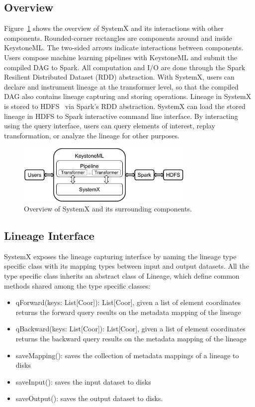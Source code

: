 \documentclass{sig-alternate}
\newenvironment{shortlist}{
        \vspace*{-0.5em}
  \begin{itemize}
  \setlength{\itemsep}{-0.1em}
}{
  \end{itemize}
        \vspace*{-0.5em}
}
\begin{document}
\subsection{Overview}
Figure~\ref{fig:architecture} shows the overview of SystemX and its interactions with other components. 
Rounded-corner rectangles are components around and inside KeystoneML. 
The two-sided arrows indicate interactions between components.
Users compose machine learning pipelines with KeystoneML and submit the compiled DAG to Spark.
All computation and I/O are done through the Spark Resilient Distributed Dataset (RDD) abstraction.
With SystemX, users can declare and instrument lineage at the transformer level, 
so that the compiled DAG also contains lineage capturing and storing operations.
Lineage in SystemX is stored to HDFS~\cite{shvachko10} via Spark's RDD abstraction.
SystemX can load the stored lineage in HDFS to Spark interactive command line interface.
By interacting using the query interface, users can query elements of interest, replay transformation, or analyze
the lineage for other purposes.

\begin{figure}[h]
\begin{center}
    \includegraphics[width=85mm]{pictures/architecture}
\caption {Overview of SystemX and its surrounding components.
    \label{fig:architecture}
}
\end{center}
\end{figure}

\subsection{Lineage Interface}
\label{sec:Design-Lineage}
SystemX exposes the lineage capturing interface by naming the lineage type specific class with its mapping types between input and output datasets.
All the type specific class inherits an abstract class of Lineage, which define common methods shared among the type specific classes:
\begin{shortlist}
\item{} qForward(keys: List[Coor]): List[Coor], given a list of element coordinates returns the forward query results on the metadata mapping of the lineage
\item{} qBackward(keys: List[Coor]): List[Coor], given a list of element coordinates returns the backward query results on the metadata mapping of the lineage
\item{} saveMapping(): saves the collection of metadata mappings of a lineage to disks
\item{} saveInput(): saves the input dataset to disks
\item{} saveOutput(): saves the output dataset to disks.
\end{shortlist}
\end{document}
